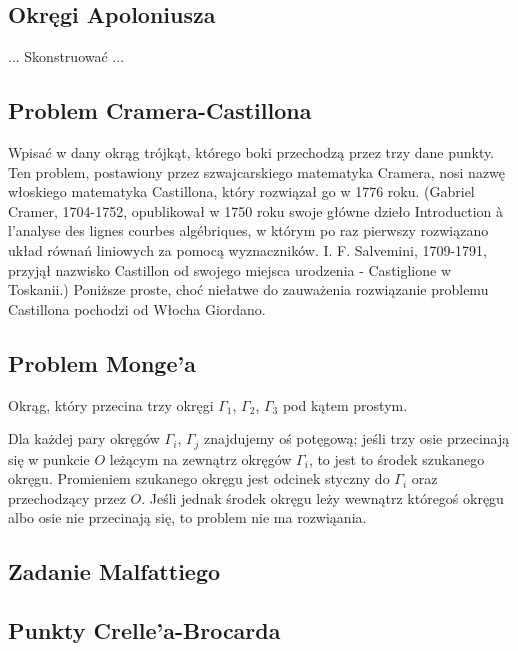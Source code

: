 \subsection{Okręgi Apoloniusza}
\begin{problem}
    \label{problem_apolloniusza}%
    ...
    Skonstruować ...
\end{problem}

\subsection{Problem Cramera-Castillona}
Wpisać w dany okrąg trójkąt, którego boki przechodzą przez trzy dane punkty.
Ten problem, postawiony przez szwajcarskiego matematyka Cramera, nosi nazwę włoskiego matematyka Castillona, który rozwiązał go w 1776 roku.
(Gabriel Cramer, 1704-1752, opublikował w 1750 roku swoje główne dzieło Introduction à l’analyse des lignes courbes algébriques, w którym po raz pierwszy rozwiązano układ równań liniowych za pomocą wyznaczników.
I. F. Salvemini, 1709-1791, przyjął nazwisko Castillon od swojego miejsca urodzenia - Castiglione w Toskanii.)
Poniższe proste, choć niełatwe do zauważenia rozwiązanie problemu Castillona pochodzi od Włocha Giordano.

\subsection{Problem Monge'a}
\begin{problem}[Monge'a?]
    Okrąg, który przecina trzy okręgi $\Gamma_1$, $\Gamma_2$, $\Gamma_3$ pod kątem prostym.
\end{problem}

Dla każdej pary okręgów $\Gamma_i$, $\Gamma_j$ znajdujemy oś potęgową; jeśli trzy osie przecinają się w punkcie $O$ leżącym na zewnątrz okręgów $\Gamma_i$, to jest to środek szukanego okręgu.
Promieniem szukanego okręgu jest odcinek styczny do $\Gamma_i$ oraz przechodzący przez $O$.
Jeśli jednak środek okręgu leży wewnątrz któregoś okręgu albo osie nie przecinają się, to problem nie ma rozwiąania.

\subsection{Zadanie Malfattiego}


\subsection{Punkty Crelle'a-Brocarda}

